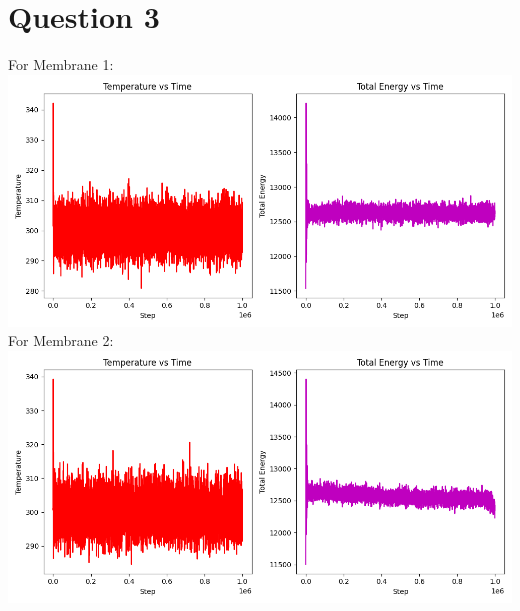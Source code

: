 \documentclass[11pt]{article}
\begin{document}
\section{Question 3}

For Membrane 1: \\
\includegraphics[scale=0.5]{Mem1_2.png} \\

For Membrane 2: \\
\includegraphics[scale=0.5]{Mem2_2.png} \\
\end{document}
